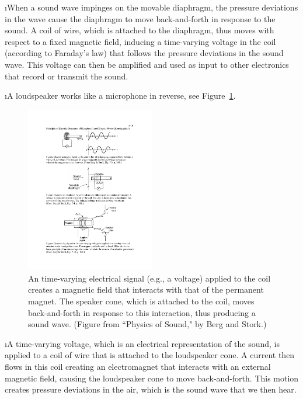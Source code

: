 \i When a sound wave impinges on the movable diaphragm, 
the pressure deviations in the wave cause the diaphragm 
to move back-and-forth in response to the sound.
A coil of wire, which is attached to the diaphragm, thus 
moves with respect to a fixed magnetic field, inducing a
time-varying voltage in the coil (according to Faraday's
law) that follows the pressure deviations in the sound wave.
This voltage can then be amplified and used as input 
to other electronics that record or transmit the sound. 

\i A loudspeaker works like a microphone in reverse, see
Figure~\ref{f:loudspeaker}.
%
\begin{figure}[htbp]
\begin{center}
\includegraphics[width=0.5\textwidth]{loudspeaker}
\caption{An time-varying electrical signal (e.g., a voltage) 
applied to the coil creates a magnetic field that interacts 
with that of the permanent magnet.
The speaker cone, which is attached to the coil, 
moves back-and-forth in response to this interaction,
thus producing a sound wave. 
(Figure from ``Physics of Sound," by Berg and Stork.)} 
\label{f:loudspeaker}
\end{center}
\end{figure}
%

\i A time-varying voltage, which is an electrical 
representation of the sound, is applied to a coil of wire 
that is attached to the loudspeaker cone.
A current then flows in this coil creating an electromagnet
that interacts with an external magnetic field, causing
the loudspeaker cone to move back-and-forth.
This motion creates pressure deviations in 
the air, which is the sound wave that we then hear.

